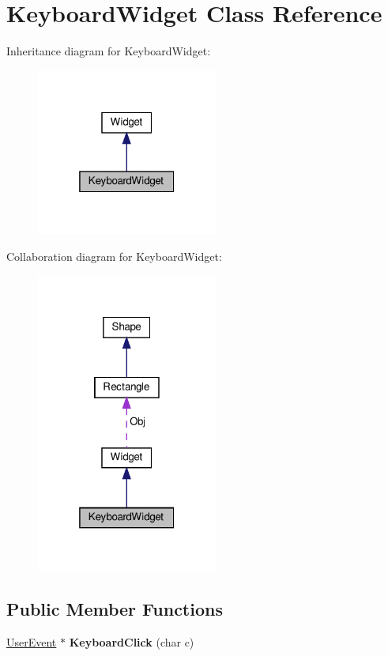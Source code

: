 \hypertarget{classKeyboardWidget}{}\section{Keyboard\+Widget Class Reference}
\label{classKeyboardWidget}


Inheritance diagram for Keyboard\+Widget\+:\nopagebreak
\begin{figure}[H]
\begin{center}
\leavevmode
\includegraphics[width=169pt]{classKeyboardWidget__inherit__graph}
\end{center}
\end{figure}


Collaboration diagram for Keyboard\+Widget\+:\nopagebreak
\begin{figure}[H]
\begin{center}
\leavevmode
\includegraphics[width=169pt]{classKeyboardWidget__coll__graph}
\end{center}
\end{figure}
\subsection*{Public Member Functions}
\begin{DoxyCompactItemize}
\item 
\mbox{\label{classKeyboardWidget_a5d1134565c170b1926256b4712e6acba}} 
\hyperlink{classUserEvent}{User\+Event} $\ast$ {\bfseries Keyboard\+Click} (char c)
\end{DoxyCompactItemize}
